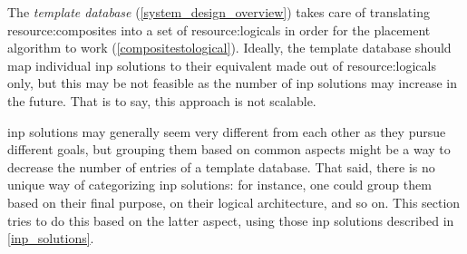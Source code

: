 The \textit{template database} (\autoref{system_design_overview}) takes care of translating \glspl{resource:composite} into a set of \glspl{resource:logical} in order for the placement algorithm to work (\autoref{compositestological}).
Ideally, the template database should map individual \gls{inp} solutions to their equivalent made out of \glspl{resource:logical} only, but this may be not feasible as the number of \gls{inp} solutions may increase in the future.
That is to say, this approach is not scalable.

\gls{inp} solutions may generally seem very different from each other as they pursue different goals, but grouping them based on common aspects might be a way to decrease the number of entries of a template database. %
That said, there is no unique way of categorizing \gls{inp} solutions: for instance, one could group them based on their final purpose, on their logical architecture, and so on.
This section tries to do this based on the latter aspect, using those \gls{inp} solutions described in \autoref{inp_solutions}.